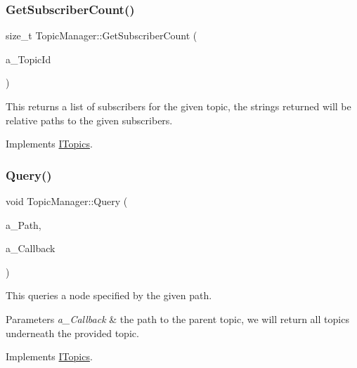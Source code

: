 \subsubsection{\texorpdfstring{Get\+Subscriber\+Count()}{GetSubscriberCount()}}
{\footnotesize\ttfamily size\+\_\+t Topic\+Manager\+::\+Get\+Subscriber\+Count (\begin{DoxyParamCaption}\item[{const std\+::string \&}]{a\+\_\+\+Topic\+Id }\end{DoxyParamCaption})\hspace{0.3cm}{\ttfamily [virtual]}}

This returns a list of subscribers for the given topic, the strings returned will be relative paths to the given subscribers. 

Implements \hyperlink{class_i_topics_a5e49b50568c300e2f3a182942a3c316d}{I\+Topics}.

\mbox{\label{class_topic_manager_a7b1d312d794d8876c0ea8592eb41a82b}} 
\subsubsection{\texorpdfstring{Query()}{Query()}}
{\footnotesize\ttfamily void Topic\+Manager\+::\+Query (\begin{DoxyParamCaption}\item[{const std\+::string \&}]{a\+\_\+\+Path,  }\item[{Query\+Callback}]{a\+\_\+\+Callback }\end{DoxyParamCaption})\hspace{0.3cm}{\ttfamily [virtual]}}



This queries a node specified by the given path. 


\begin{DoxyParams}{Parameters}
{\em a\+\_\+\+Callback} & the path to the parent topic, we will return all topics underneath the provided topic. \\
\hline
\end{DoxyParams}


Implements \hyperlink{class_i_topics_a2d0193d6be4ce0c10d4bf352c21eb56a}{I\+Topics}.

\mbox{\label{class_topic_manager_a681e4ef90d13d2f0cca948135f4c8097}} 
